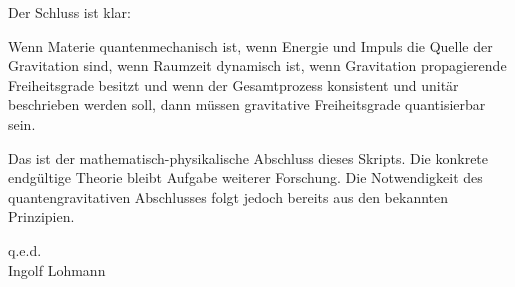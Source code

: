 \documentclass[11pt,a4paper]{book}
\theoremstyle{remark}
\begin{document}
Der Schluss ist klar:

\begin{merkkasten}
Wenn Materie quantenmechanisch ist, wenn Energie und Impuls die Quelle der Gravitation sind, wenn Raumzeit dynamisch ist, wenn Gravitation propagierende Freiheitsgrade besitzt und wenn der Gesamtprozess konsistent und unitär beschrieben werden soll, dann müssen gravitative Freiheitsgrade quantisierbar sein.
\end{merkkasten}

Das ist der mathematisch-physikalische Abschluss dieses Skripts. Die konkrete endgültige Theorie bleibt Aufgabe weiterer Forschung. Die Notwendigkeit des quantengravitativen Abschlusses folgt jedoch bereits aus den bekannten Prinzipien.

q.e.d.\\
Ingolf Lohmann
\end{document}
